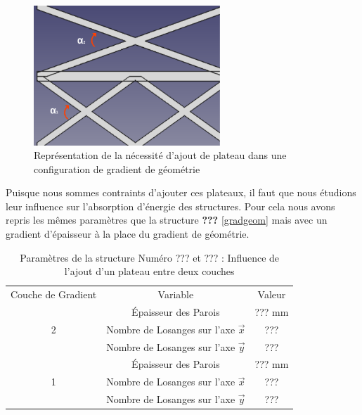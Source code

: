 \documentclass[a4paper]{article}
\begin{document}
	\begin{figure}[H]
		\centering
		\includegraphics[width=7cm]{Images/6/gradient_geom_alpha.pdf}
		\caption{Représentation de la nécessité d’ajout de plateau dans une configuration de gradient de géométrie}
	\end{figure}

	Puisque nous sommes contraints d'ajouter ces plateaux, il faut que nous étudions leur influence sur l'absorption d'énergie des structures. Pour cela nous avons repris les mêmes paramètres que la structure \textbf{???} \ref{gradgeom} mais avec un gradient d'épaisseur à la place du gradient de géométrie.
	
	\begin{table}[H]
		\centering
		\begin{tabular}{|c|c|c|}
			\hline
			\rowcolor{Gray}
			\multicolumn{3}{c}{Structure de Référence}\\\hline
			\rowcolor{Gray}
			Couche de Gradient & Variable & Valeur\\
			\hline\hline
			& \textcolor[rgb]{1,0,0}{Épaisseur des Parois} & \textcolor[rgb]{1,0,0}{??? mm}\\
			\textcolor[rgb]{1,0,0}{2} & \textcolor[rgb]{1,0,0}{Nombre de Losanges sur l'axe $\vec{x}$} & \textcolor[rgb]{1,0,0}{???}\\
			& \textcolor[rgb]{1,0,0}{Nombre de Losanges sur l'axe $\vec{y}$} & \textcolor[rgb]{1,0,0}{???}\\
			\hline
			& \textcolor[rgb]{0,0.5,0}{Épaisseur des Parois} & \textcolor[rgb]{0,0.5,0}{??? mm}\\
			\textcolor[rgb]{0,0.5,0}{1} & \textcolor[rgb]{0,0.5,0}{Nombre de Losanges sur l'axe $\vec{x}$} & \textcolor[rgb]{0,0.5,0}{???}\\
			& \textcolor[rgb]{0,0.5,0}{Nombre de Losanges sur l'axe $\vec{y}$} & \textcolor[rgb]{0,0.5,0}{???}\\
			\hline
		\end{tabular}
		\caption{Paramètres de la structure Numéro ??? et ??? : Influence de l'ajout d'un plateau entre deux couches}
	\end{table}
	
\end{document}

